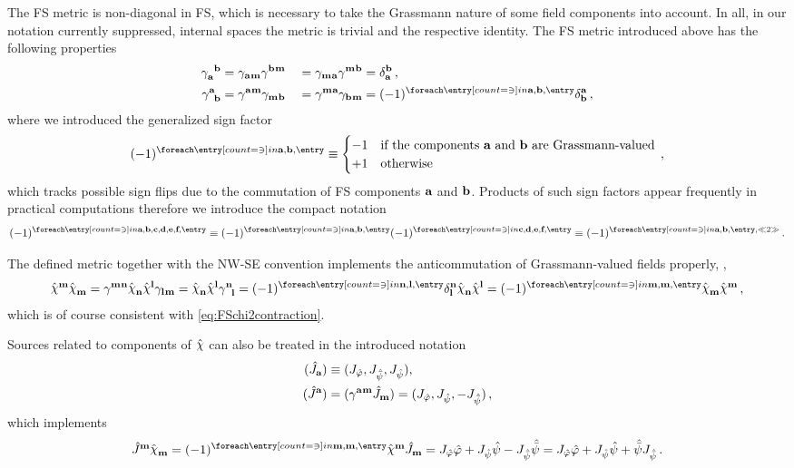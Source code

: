 The FS metric is non-diagonal in FS, which is necessary to take the Grassmann nature of some field components into account.
In all, in our notation currently suppressed, internal spaces the metric is trivial and the respective identity.
The FS metric introduced above has the following properties
\begin{alignat}{2}
	\FSgdu{a}{b} &= \FSgdd{a}{m}\FSguu{b}{m} &&= \FSgdd{m}{a}\FSguu{m}{b} = \FSd{b}{a} \, ,\\
	\FSgud{a}{b} &= \FSguu{a}{m}\FSgdd{m}{b} &&= \FSguu{m}{a}\FSgdd{b}{m} = \FSc{\FSidx{a},\FSidx{b}}\FSd{a}{b} \, ,
\end{alignat}
where we introduced the generalized sign factor
\begin{align}
	\FSc{\FSidx{a},\FSidx{b}}\equiv%
	\begin{cases}%
		-1 & \text{if the components $\FSidx{a}$ and $\FSidx{b}$ are Grassmann-valued}\\
		+1 &\text{otherwise}%
	\end{cases} \, ,\label{eq:FScDef}
\end{align}
which tracks possible sign flips due to the commutation of FS components $\textbf{a}$ and $\textbf{b}$.
Products of such sign factors appear frequently in practical computations therefore we introduce the compact notation
\begin{align}
	\FSc{\FSidx{a},\FSidx{b},\FSidx{c},\FSidx{d},\FSidx{e},\FSidx{f}}\equiv\FSc{\FSidx{a},\FSidx{b}}\FSc{\FSidx{c},\FSidx{d},\FSidx{e},\FSidx{f}} \equiv \FScSkeleton{\FSidx{a},\FSidx{b}}{2}{}\, . \label{eq:FScAbr}
\end{align}

The defined metric together with the NW-SE convention implements the anticommutation of Grassmann-valued fields properly, \eg,
\begin{align}
	\FSfu{\FSsf}{m}\FSfd{\FSsf}{m}
		=\FSguu{m}{n}\FSfd{\FSsf}{n}\FSfu{\FSsf}{l}\FSgdd{l}{m}
		=\FSfd{\FSsf}{n}\FSfu{\FSsf}{l}\FSgud{n}{l}
		=\FSc{\FSidx{n},\FSidx{l}}\FSd{n}{l}\FSfd{\FSsf}{n}\FSfu{\FSsf}{l}
		=\FSc{\FSidx{m},\FSidx{m}}\FSfd{\FSsf}{m}\FSfu{\FSsf}{m} \, ,
\end{align}
which is of course consistent with \cref{eq:FSchi2contraction}.

Sources related to components of $\FSf{\FSsf}$ can also be treated in the introduced notation
\begin{align}
	(\hat{J}_{\textbf{a}})&\equiv (J_{\hat{\varphi}},J_{\hat{\bar{\psi}}}, J_{\hat{\psi}}),\\
	(\hat{J}^{\textbf{a}})&=(\gamma^{\textbf{a}\mkern1mu\textbf{m}}\hat{J}_{\textbf{m}})= (J_{\hat{\varphi}},J_{\hat{\psi}}, -J_{\hat{\bar{\psi}}}) \, ,
\end{align}
which implements
\begin{align}
	\FSfu{J}{m}\FSfd{\FSsf}{m}=\FSc{\FSidx{m},\FSidx{m}}\FSfu{\FSsf}{m}\FSfd{J}{m}
		=J_{\FSf{\MFphi}}\FSf{\MFphi}+ J_{\FSf{\MFpsi}}\FSf{\MFpsi}- J_{\FSf{\MFpsib}}\FSf{\MFpsib}
		=J_{\FSf{\MFphi}}\FSf{\MFphi}+ J_{\FSf{\MFpsi}}\FSf{\MFpsi}+ \FSf{\MFpsib}J_{\FSf{\MFpsib}} \, .
\end{align}

